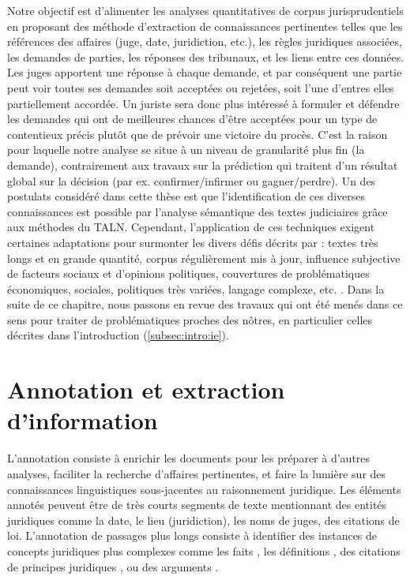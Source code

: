 Notre objectif est d'alimenter les analyses quantitatives de corpus jurisprudentiels en proposant des méthode d'extraction de connaissances pertinentes telles que les références des affaires (juge, date, juridiction, etc.), les règles juridiques associées, les demandes de parties, les réponses des tribunaux, et les liens entre ces données. Les juges apportent une réponse à chaque demande, et par conséquent une partie peut voir toutes ses demandes soit acceptées ou rejetées, soit l'une d'entres elles partiellement accordée. Un juriste sera donc plus intéressé à formuler et défendre les demandes qui ont de meilleures chances d'être acceptées pour un type de contentieux précis plutôt que de prévoir une victoire du procès. C'est la raison pour laquelle notre analyse se situe à un niveau de granularité plus fin (la demande), contrairement aux travaux sur la prédiction qui traitent d'un résultat global sur la décision (par ex. confirmer/infirmer ou gagner/perdre).  Un des postulats considéré dans cette thèse est que l'identification de ces diverses connaissances est possible par l'analyse sémantique des textes judiciaires grâce aux méthodes du TALN. Cependant, l'application de ces techniques exigent certaines adaptations pour surmonter les divers défis décrits par \citet{narazenko2017legalnlpintro} : textes très longs et en grande quantité, corpus régulièrement mis à jour, influence subjective de facteurs sociaux et d'opinions politiques, couvertures de problématiques économiques, sociales, politiques très variées, langage complexe, etc. . Dans la suite de ce chapitre, nous passons en revue des travaux qui ont été menés dans ce sens pour traiter de problématiques proches des nôtres, en particulier celles décrites dans l'introduction (\ref{subsec:intro:ie}). 

\section{Annotation et extraction d'information}

L'annotation consiste à enrichir les documents pour les préparer à d'autres analyses, faciliter la recherche d'affaires pertinentes, et faire la lumière sur des connaissances linguistiques sous-jacentes au raisonnement juridique. Les éléments annotés peuvent être de très courts segments de texte mentionnant des entités juridiques \citep{Waltl2016lexia, wyner2010extractlegalelts} comme la date, le lieu (juridiction), les noms de juges, des citations de loi.  L'annotation de passages plus longs consiste à identifier des instances de concepts juridiques plus complexes comme les faits \citep{wyner2010extractlegalelts, wyner2010casefactors, Shulayeva2017recognfactprincip}, les définitions \citep{Waltl2016lexia,waltl2017legaliegerman}, des citations de principes juridiques \citep{Shulayeva2017recognfactprincip}, ou des arguments \citep{WynerMoens2010mineargument}. 

